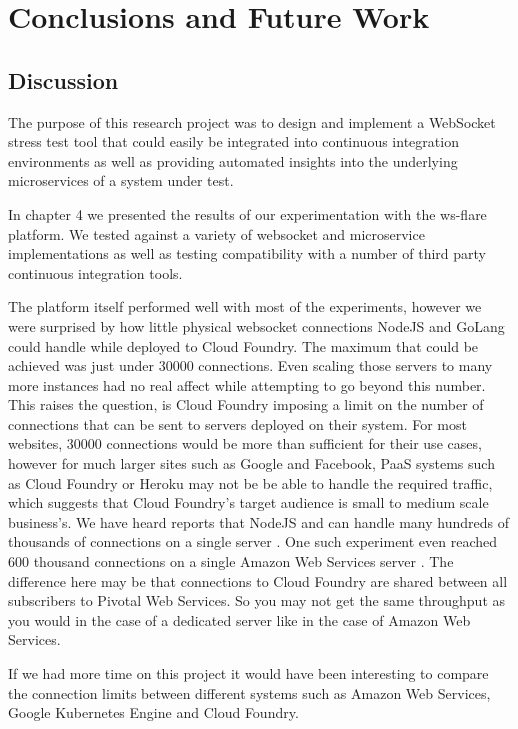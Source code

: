 \chapter{Conclusions and Future Work}

\section{Discussion}

The purpose of this research project was to design and implement a WebSocket stress test tool that could easily be integrated into continuous integration environments as well as providing automated insights into the underlying microservices of a system under test.

In chapter 4 we presented the results of our experimentation with the ws-flare platform. We tested against a variety of websocket and microservice implementations as well as testing compatibility with a number of third party continuous integration tools. 

The platform itself performed well with most of the experiments, however we were surprised by how little physical websocket connections NodeJS and GoLang could handle while deployed to Cloud Foundry. The maximum that could be achieved was just under 30000 connections. Even scaling those servers to many more instances had no real affect while attempting to go beyond this number. This raises the question, is Cloud Foundry imposing a limit on the number of connections that can be sent to servers deployed on their system. For most websites, 30000 connections would be more than sufficient for their use cases, however for much larger sites such as Google and Facebook, PaaS systems such as Cloud Foundry or Heroku may not be be able to handle the required traffic, which suggests that Cloud Foundry's target audience is small to medium scale business's. We have heard reports that NodeJS and can handle many hundreds of thousands of connections on a single server \cite{nodeConnections}. One such experiment even reached 600 thousand connections on a single Amazon Web Services server \cite{nodeConnections}. The difference here may be that connections to Cloud Foundry are shared between all subscribers to Pivotal Web Services. So you may not get the same throughput as you would in the case of a dedicated server like in the case of Amazon Web Services. 

If we had more time on this project it would have been interesting to compare the connection limits between different systems such as Amazon Web Services, Google Kubernetes Engine and Cloud Foundry. 

